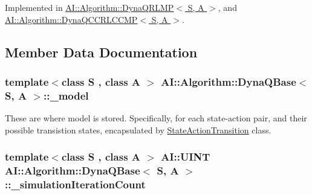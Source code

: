 Implemented in \hyperlink{classAI_1_1Algorithm_1_1DynaQRLMP_a7b3b5f3706744290b12c19f786e5e4e4}{A\+I\+::\+Algorithm\+::\+Dyna\+Q\+R\+L\+M\+P$<$ S, A $>$}, and \hyperlink{classAI_1_1Algorithm_1_1DynaQCCRLCCMP_aebff9b81db5bd2ae33bd3d6662539bc0}{A\+I\+::\+Algorithm\+::\+Dyna\+Q\+C\+C\+R\+L\+C\+C\+M\+P$<$ S, A $>$}.



\subsection{Member Data Documentation}
\hypertarget{classAI_1_1Algorithm_1_1DynaQBase_a65878fdff793c8b4bef59bb128e19bd8}{
\subsubsection[{\+\_\+model}]{\setlength{\rightskip}{0pt plus 5cm}template$<$class S , class A $>$ {\bf A\+I\+::\+Algorithm\+::\+Dyna\+Q\+Base}$<$ S, A $>$\+::\+\_\+model\hspace{0.3cm}{\ttfamily [protected]}}}\label{classAI_1_1Algorithm_1_1DynaQBase_a65878fdff793c8b4bef59bb128e19bd8}
These are where model is stored. Specifically, for each state-\/action pair, and their possible transistion states, encapsulated by \hyperlink{classAI_1_1Algorithm_1_1StateActionTransition}{State\+Action\+Transition} class. \hypertarget{classAI_1_1Algorithm_1_1DynaQBase_a3d375c3e01c7cc8a30c92109780adb9b}{
\subsubsection[{\+\_\+simulation\+Iteration\+Count}]{\setlength{\rightskip}{0pt plus 5cm}template$<$class S , class A $>$ {\bf A\+I\+::\+U\+I\+N\+T} {\bf A\+I\+::\+Algorithm\+::\+Dyna\+Q\+Base}$<$ S, A $>$\+::\+\_\+simulation\+Iteration\+Count\hspace{0.3cm}{\ttfamily [protected]}}}\label{classAI_1_1Algorithm_1_1DynaQBase_a3d375c3e01c7cc8a30c92109780adb9b}
